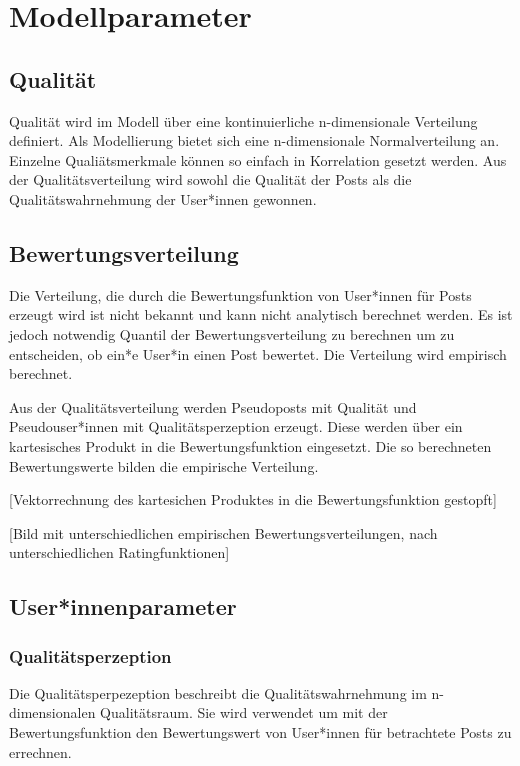 \chapter{Modellparameter}

\section{Qualität}

Qualität wird im Modell über eine kontinuierliche n-dimensionale Verteilung definiert. Als Modellierung bietet sich eine n-dimensionale Normalverteilung an. Einzelne Qualiätsmerkmale können so einfach in Korrelation gesetzt werden. Aus der Qualitätsverteilung wird sowohl die Qualität der Posts als die Qualitätswahrnehmung der User*innen gewonnen.


\section{Bewertungsverteilung}

Die Verteilung, die durch die Bewertungsfunktion von User*innen für Posts erzeugt wird ist nicht bekannt und kann nicht analytisch berechnet werden. Es ist jedoch notwendig Quantil der Bewertungsverteilung zu berechnen um zu entscheiden, ob ein*e User*in einen Post bewertet. Die Verteilung wird empirisch berechnet.

Aus der Qualitätsverteilung werden Pseudoposts mit Qualität und Pseudouser*innen mit Qualitätsperzeption erzeugt. Diese werden über ein kartesisches Produkt in die Bewertungsfunktion eingesetzt. Die so berechneten Bewertungswerte bilden die empirische Verteilung. 

[Vektorrechnung des kartesichen Produktes in die Bewertungsfunktion gestopft]

[Bild mit unterschiedlichen empirischen Bewertungsverteilungen, nach unterschiedlichen Ratingfunktionen]



\section{User*innenparameter}


\subsection{Qualitätsperzeption}

Die Qualitätsperpezeption beschreibt die Qualitätswahrnehmung im n-dimensionalen Qualitätsraum. Sie wird verwendet um mit der Bewertungsfunktion den Bewertungswert von User*innen für betrachtete Posts zu errechnen.

